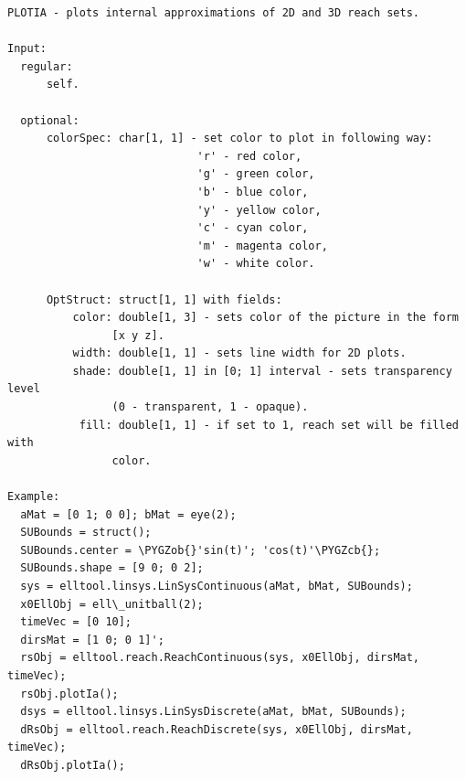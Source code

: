 \documentclass[letterpaper,10pt,english]{sphinxmanual}
\def\PYGZob{\char`\{}
\def\PYGZcb{\char`\}}
\begin{document}
\begin{Verbatim}[commandchars=\\\{\}]
PLOTIA - plots internal approximations of 2D and 3D reach sets.

Input:
  regular:
      self.

  optional:
      colorSpec: char[1, 1] - set color to plot in following way:
                             'r' - red color,
                             'g' - green color,
                             'b' - blue color,
                             'y' - yellow color,
                             'c' - cyan color,
                             'm' - magenta color,
                             'w' - white color.

      OptStruct: struct[1, 1] with fields:
          color: double[1, 3] - sets color of the picture in the form
                [x y z].
          width: double[1, 1] - sets line width for 2D plots.
          shade: double[1, 1] in [0; 1] interval - sets transparency level
                (0 - transparent, 1 - opaque).
           fill: double[1, 1] - if set to 1, reach set will be filled with
                color.

Example:
  aMat = [0 1; 0 0]; bMat = eye(2);
  SUBounds = struct();
  SUBounds.center = \PYGZob{}'sin(t)'; 'cos(t)'\PYGZcb{};
  SUBounds.shape = [9 0; 0 2];
  sys = elltool.linsys.LinSysContinuous(aMat, bMat, SUBounds);
  x0EllObj = ell\_unitball(2);
  timeVec = [0 10];
  dirsMat = [1 0; 0 1]';
  rsObj = elltool.reach.ReachContinuous(sys, x0EllObj, dirsMat, timeVec);
  rsObj.plotIa();
  dsys = elltool.linsys.LinSysDiscrete(aMat, bMat, SUBounds);
  dRsObj = elltool.reach.ReachDiscrete(sys, x0EllObj, dirsMat, timeVec);
  dRsObj.plotIa();
\end{Verbatim}
\end{document}
